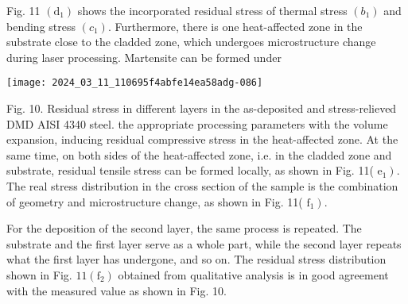 \documentclass[10pt]{article}
\begin{document}
Fig. 11 $\left(\mathrm{d}_{1}\right)$ shows the incorporated residual stress of thermal stress $\left(b_{1}\right)$ and bending stress $\left(c_{1}\right)$. Furthermore, there is one heat-affected zone in the substrate close to the cladded zone, which undergoes microstructure change during laser processing. Martensite can be formed under

\begin{center}
\texttt{[image: 2024\_03\_11\_110695f4abfe14ea58adg-086]}
\end{center}

Fig. 10. Residual stress in different layers in the as-deposited and stress-relieved DMD AISI 4340 steel. the appropriate processing parameters with the volume expansion, inducing residual compressive stress in the heat-affected zone. At the same time, on both sides of the heat-affected zone, i.e. in the cladded zone and substrate, residual tensile stress can be formed locally, as shown in Fig. 11( $\left.\mathrm{e}_{1}\right)$. The real stress distribution in the cross section of the sample is the combination of geometry and microstructure change, as shown in Fig. 11( $\left.\mathrm{f}_{1}\right)$.

For the deposition of the second layer, the same process is repeated. The substrate and the first layer serve as a whole part, while the second layer repeats what the first layer has undergone, and so on. The residual stress distribution shown in Fig. $11\left(\mathrm{f}_{2}\right)$ obtained from qualitative analysis is in good agreement with the measured value as shown in Fig. 10.
\end{document}
